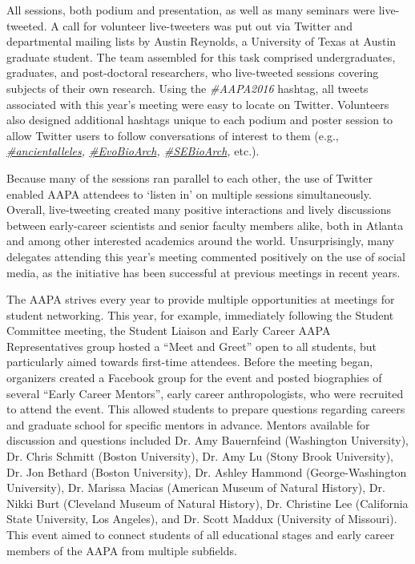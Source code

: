 All sessions, both podium and presentation, as well as many seminars were live-tweeted.
A call for volunteer live-tweeters was put out via Twitter and departmental mailing lists by Austin Reynolds,
a University of Texas at Austin graduate student. 
The team assembled for this task comprised undergraduates, graduates, and post-doctoral researchers, 
who live-tweeted sessions covering subjects of their own research. 
Using the \emph{\#AAPA2016} hashtag, all tweets associated with this year’s meeting were easy to locate on Twitter. 
Volunteers also designed additional hashtags unique to each podium and poster session to allow Twitter users to
follow conversations of interest to them (e.g., \emph{\href{http://twitter.com/search?q=\%23ancientalleles\&src=typd}{\#ancientalleles}, \href{http://twitter.com/search?q=\%23EvoBioArch\&src=typd}{\#EvoBioArch}, \href{https://twitter.com/search?q=\%23SEBioArch\&src=typd}{\#SEBioArch},} etc.).

Because many of the sessions ran parallel to each other, the use of Twitter enabled AAPA attendees to ‘listen in’ on multiple sessions simultaneously. 
Overall, live-tweeting created many positive interactions and lively discussions between early-career scientists and senior faculty members alike, both in Atlanta and among other interested academics around the world.
Unsurprisingly, many delegates attending this year’s meeting commented positively on the use of social media, as the initiative has been successful at previous meetings in recent years.

 The  AAPA strives every year to provide multiple opportunities at meetings for student networking.
This year, for example, immediately following the Student Committee meeting, 
the Student Liaison and Early Career AAPA Representatives group hosted a “Meet and Greet” open to all students,
but particularly aimed towards first-time attendees. 
Before the meeting began, organizers created a Facebook group for the event and posted biographies of several “Early Career Mentors”,
early career anthropologists, who were recruited to attend the event.
This allowed students to prepare questions regarding careers and graduate school for specific mentors in advance.  
Mentors available for discussion and questions included Dr. Amy Bauernfeind (Washington University),
Dr. Chris Schmitt (Boston University), Dr. Amy Lu (Stony Brook University), Dr. Jon Bethard (Boston University),
Dr. Ashley Hammond (George-Washington University), Dr. Marissa Macias (American Museum of Natural History),
Dr. Nikki Burt (Cleveland Museum of Natural History), Dr. Christine Lee (California State University, Los Angeles),
and Dr. Scott Maddux (University of Missouri).
This event aimed to connect students of all educational stages and early career members of the AAPA from multiple subfields.  

